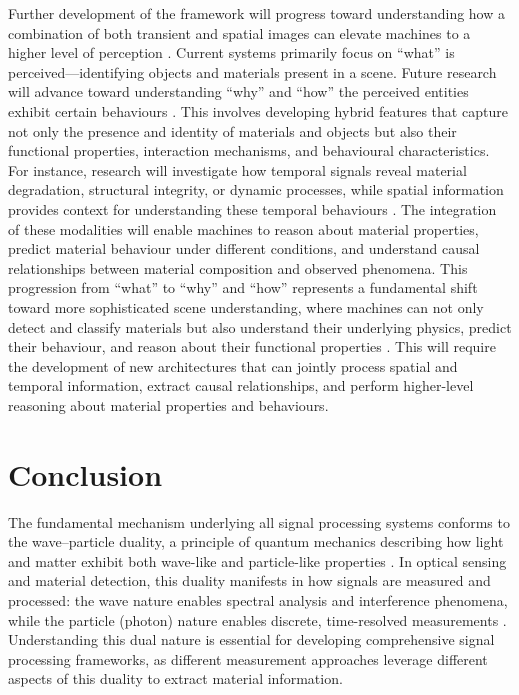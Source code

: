 \documentclass[12pt,a4paper,oneside]{report}
\let\oldsection\section
\renewcommand{\section}{\clearpage\oldsection}
\begin{document}
Further development of the framework will progress toward understanding how a combination of both transient and spatial images can elevate machines to a higher level of perception \cite{moramartin2021,yang2023,yang2024}. Current systems primarily focus on ``what'' is perceived—identifying objects and materials present in a scene. Future research will advance toward understanding ``why'' and ``how'' the perceived entities exhibit certain behaviours \cite{gadzicki2020,yang2024}. This involves developing hybrid features that capture not only the presence and identity of materials and objects but also their functional properties, interaction mechanisms, and behavioural characteristics. For instance, research will investigate how temporal signals reveal material degradation, structural integrity, or dynamic processes, while spatial information provides context for understanding these temporal behaviours \cite{moramartin2021,lyons2019}. The integration of these modalities will enable machines to reason about material properties, predict material behaviour under different conditions, and understand causal relationships between material composition and observed phenomena. This progression from ``what'' to ``why'' and ``how'' represents a fundamental shift toward more sophisticated scene understanding, where machines can not only detect and classify materials but also understand their underlying physics, predict their behaviour, and reason about their functional properties \cite{yang2024,gadzicki2020}. This will require the development of new architectures that can jointly process spatial and temporal information, extract causal relationships, and perform higher-level reasoning about material properties and behaviours.




\section{Conclusion}
\label{subsec:conclusion_chapter_3}

The fundamental mechanism underlying all signal processing systems conforms to the wave--particle duality, a principle of quantum mechanics describing how light and matter exhibit both wave-like and particle-like properties \cite{bohr1923,elachi2021,griffiths2017}. In optical sensing and material detection, this duality manifests in how signals are measured and processed: the wave nature enables spectral analysis and interference phenomena, while the particle (photon) nature enables discrete, time-resolved measurements \cite{elachi2021}. Understanding this dual nature is essential for developing comprehensive signal processing frameworks, as different measurement approaches leverage different aspects of this duality to extract material information.
\end{document}
